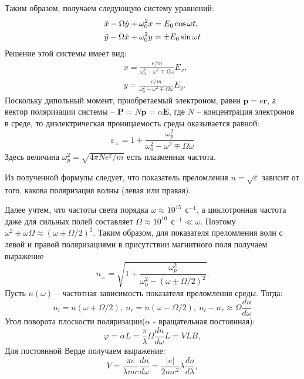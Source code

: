 \documentclass[12pt,a4paper]{article}
\begin{document}
 Таким образом, получаем следующую систему уравнений:
   \begin{align*}
     &\Ddot{x} - \Omega\Dot{y} + \omega_{0}^2 x = E_0 \cos{\omega t},\\
     &\Ddot{y} - \Omega\Dot{x} + \omega_{0}^2 y =\pm E_0 \sin{\omega t}
  \end{align*}
Решение этой системы имеет вид:
   \begin{align*}
     &x = \frac{e/m}{\omega^2_0 - \omega^2 \mp \Omega\omega}E_x,\\
     &y = \frac{e/m}{\omega^2_0 - \omega^2 \mp \Omega\omega}E_y.
  \end{align*}
Поскольку дипольный момент, приобретаемый электроном, равен $\textbf{p} = e\textbf{r}$, а вектор поляризации системы -- $\textbf{P} = N\textbf{p} = \alpha\textbf{E}$, где $N$ -- концентрация электронов в среде, то диэлектрическая проницаемость среды оказывается равной:
\begin{equation*}
    \varepsilon_{\pm} = 1 + \frac{\omega^2_p}{\omega^2_0 - \omega^2 \mp \Omega\omega}
\end{equation*}
Здесь величина $\omega^2_p = \sqrt{4 \pi N e^2/m}$ есть плазменная частота.

Из полученной формулы следует, что показатель преломления $n = \sqrt{\varepsilon}$ зависит от того, какова поляризация волны (левая или правая).

Далее учтем, что частоты света порядка $\omega \approx 10^{15}\:\: \mbox{с}^{-1}$, а циклотронная частота даже для сильных полей составляет $\Omega \approx 10^{10}\:\: \mbox{с}^{-1} \ll \omega$. Поэтому $\omega^2 \pm \omega \Omega \approx (\omega \pm \Omega/2)^2$. Таким образом, для показателя преломления волн с левой и правой поляризациями в присутствии магнитного поля получаем выражение
\begin{equation*}
    n_{\pm} = \sqrt{1 + \frac{\omega^2_p}{\omega^2_0 -  (\omega \pm \Omega/2)^2}}.
\end{equation*}
Пусть $n(\omega)$ -- частотная зависимость показателя преломления среды. Тогда:
\begin{equation*}
    n_l = n(\omega + \Omega/2),\: n_r = n(\omega - \Omega/2),\: n_l - n_r \approx \Omega \frac{dn}{d\omega}
\end{equation*}
Угол поворота плоскости поляризации($\alpha$ - вращательная постоянная):
\begin{equation*}
    \varphi = \alpha L = \frac{\pi}{\lambda}\Omega \frac{dn}{d\omega} L = VLB,
\end{equation*}
Для постоянной Верде получаем выражение:
\begin{equation*}
    V = \frac{\pi e}{\lambda m c}\frac{dn}{d\omega} = \frac{|e|}{2mc^2}\lambda \frac{dn}{d \lambda} ,
\end{equation*}
\end{document}

